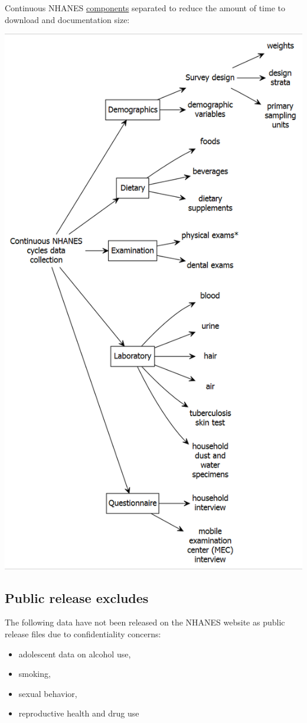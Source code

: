 \documentclass[
]{book}
\providecommand{\tightlist}{%
  \setlength{\itemsep}{0pt}\setlength{\parskip}{0pt}}
\begin{document}
Continuous NHANES \href{https://www.cdc.gov/nchs/tutorials/NHANES/SurveyOrientation/DataStructureContents/Info1.htm}{components} separated to reduce the amount of time to download and documentation size:

\includegraphics[width=0.65\linewidth]{images/g2}

\hypertarget{public-release-excludes}{%
\subsection{Public release excludes}\label{public-release-excludes}}

The following data have not been released on the NHANES website as public release files due to confidentiality concerns:

\begin{itemize}
\tightlist
\item
  adolescent data on alcohol use,
\item
  smoking,
\item
  sexual behavior,
\item
  reproductive health and drug use
\end{itemize}
\end{document}
